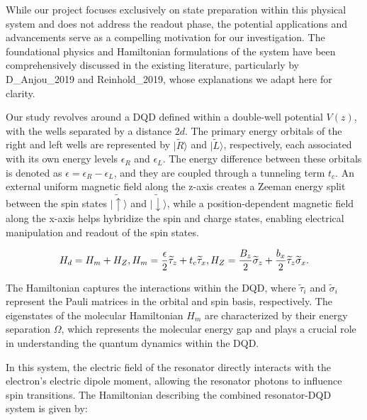 \documentclass[12pt]{report}
\begin{document}
While our project focuses exclusively on state preparation within this physical system and does not address the readout phase, the potential applications and advancements serve as a compelling motivation for our investigation. The foundational physics and Hamiltonian formulations of the system have been comprehensively discussed in the existing literature, particularly by D_Anjou_2019 and Reinhold_2019, whose explanations we adapt here for clarity.

Our study revolves around a DQD defined within a double-well potential \( V(z) \), with the wells separated by a distance \( 2d \). The primary energy orbitals of the right and left wells are represented by \( |\widetilde{R}\rangle \) and \( |\widetilde{L}\rangle \), respectively, each associated with its own energy levels \( \epsilon_R \) and \( \epsilon_L \). The energy difference between these orbitals is denoted as \( \epsilon=\epsilon_R-\epsilon_L \), and they are coupled through a tunneling term \( t_c \). An external uniform magnetic field along the z-axis creates a Zeeman energy split between the spin states \( |\widetilde{\uparrow}\rangle \) and \( |\widetilde{\downarrow}\rangle \), while a position-dependent magnetic field along the x-axis helps hybridize the spin and charge states, enabling electrical manipulation and readout of the spin states.

\[
\begin{equation}
    H_d = H_m + H_Z, \\
    H_m = \frac{\epsilon}{2} \widetilde{\tau}_z + t_c \widetilde{\tau}_x, \\
    H_Z = \frac{B_z}{2} \widetilde{\sigma}_z + \frac{b_x}{2} \widetilde{\tau}_z \widetilde{\sigma}_x .
\end{equation}
\]

The Hamiltonian captures the interactions within the DQD, where \( \widetilde{\tau}_i \) and \( \widetilde{\sigma}_i \) represent the Pauli matrices in the orbital and spin basis, respectively. The eigenstates of the molecular Hamiltonian \( H_m \) are characterized by their energy separation \( \Omega \), which represents the molecular energy gap and plays a crucial role in understanding the quantum dynamics within the DQD.

In this system, the electric field of the resonator directly interacts with the electron's electric dipole moment, allowing the resonator photons to influence spin transitions. The Hamiltonian describing the combined resonator-DQD system is given by:
\end{document}
